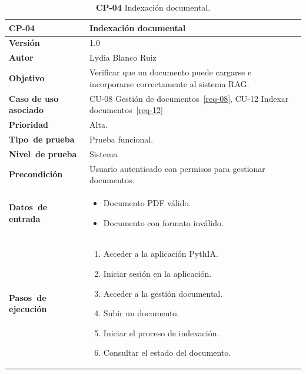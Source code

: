 \begin{table}[p]
	\centering
	\begin{tabularx}{\linewidth}{ p{} p{} }
		\toprule
		\textbf{CP-04}    & \textbf{Indexación documental}\\
		\toprule
		\textbf{Versión}              & 1.0    \\
		\textbf{Autor}                & Lydia Blanco Ruiz \\
		\textbf{Objetivo}			 & Verificar que un documento puede cargarse e incorporarse correctamente al sistema RAG.\\
		\textbf{Caso de uso asociado} &  CU-08 Gestión de documentos~\ref{req-08}, CU-12 Indexar documentos~\ref{req-12}\\
		\textbf{Prioridad}          & Alta. \\
		\textbf{\mbox{Tipo de} \mbox{prueba}}         & Prueba funcional. \\
		\textbf{\mbox{Nivel de} \mbox{prueba}}        & Sistema\\
		\textbf{Precondición}        & Usuario autenticado con permisos para gestionar documentos. \\
		\textbf{\mbox{Datos de} \mbox{entrada}} 		& 
		\begin{itemize}
		\tightlist
			\item Documento PDF válido.
			\item Documento con formato inválido.
		\end{itemize}				
		\\
		\textbf{\mbox{Pasos de} \mbox{ejecución}}		&
		\begin{enumerate}
		\tightlist
			\item Acceder a la aplicación \eng{web} PythIA.
			\item Iniciar sesión en la aplicación.
			\item Acceder a la gestión documental.
			\item Subir un documento.
			\item Iniciar el proceso de indexación.
			\item Consultar el estado del documento.
		\end{enumerate} \\
		\bottomrule
	\end{tabularx}
	\caption{\textbf{CP-04} Indexación documental.}
	\label{prueb-04}
\end{table}


